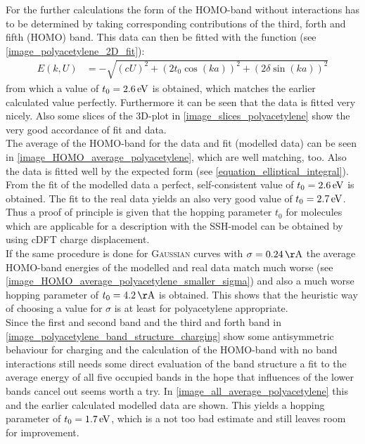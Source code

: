 For the further calculations the form of the HOMO-band without interactions has to be determined by taking corresponding contributions of the third, forth and fifth (HOMO) band. This data can then be fitted with the function (see \cref{image_polyacetylene_2D_fit}):
\begin{align}
	E(k, U) &= -\sqrt{\left(cU\right)^2 + \left(2t_0\cos(ka)\right)^2+\left(2\delta\sin(ka)\right)^2}
\end{align}
from which a value of $t_0 = \unit[2.6]{eV}$ is obtained, which matches the earlier calculated value perfectly. Furthermore it can be seen that the data is fitted very nicely. Also some slices of the 3D-plot in \cref{image_slices_polyacetylene} show the very good accordance of fit and data.\\
The average of the HOMO-band for the data and fit (modelled data) can be seen in \cref{image_HOMO_average_polyacetylene}, which are well matching, too. Also the data is fitted well by the expected form (see \cref{equation_elliptical_integral}). From the fit of the modelled data a perfect, self-consistent value of $t_0 = \unit[2.6]{eV}$ is obtained. The fit to the real data yields an also very good value of $t_0 = \unit[2.7]{eV}$.\\
Thus a proof of principle is given that the hopping parameter $t_0$ for molecules which are applicable for a description with the SSH-model can be obtained by using cDFT charge displacement.\\
If the same procedure is done for \textsc{Gaussian} curves with $\sigma = \unit[0.24]{\AA}$ the average HOMO-band energies of the modelled and real data match much worse (see \cref{image_HOMO_average_polyacetylene_smaller_sigma}) and also a much worse hopping parameter of $t_0 = \unit[4.2]{\AA}$ is obtained. This shows that the heuristic way of choosing a value for $\sigma$ is at least for polyacetylene appropriate.\\
Since the first and second band and the third and forth band in \cref{image_polyacetylene_band_structure_charging} show some antisymmetric behaviour for charging and the calculation of the HOMO-band with no band interactions still needs some direct evaluation of the band structure a fit to the average energy of all five occupied bands in the hope that influences of the lower bands cancel out seems worth a try. In \cref{image_all_average_polyacetylene} this and the earlier calculated modelled data are shown. This yields a hopping parameter of $t_0 = \unit[1.7]{eV}$, which is a not too bad estimate and still leaves room for improvement.
